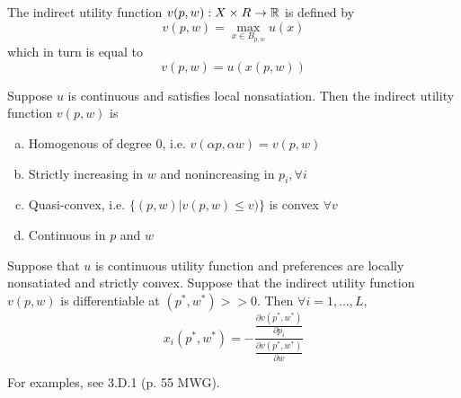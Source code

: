 \begin{definition}
  The indirect utility function $v(p,w): X \times R \to {\mathbb R}$ is defined by
  \[
  v(p,w) = \max_{x \in B_{p,w}} u(x)
  \]
  which in turn is equal to
  \[
  v(p,w) = u(x(p,w))
  \]
\end{definition}

\begin{prop}
  Suppose $u$ is continuous and satisfies local nonsatiation. Then the
  indirect utility function $v(p,w)$ is
  \begin{enumerate}[(a)]
  \item Homogenous of degree $0$, i.e. $v(\alpha p, \alpha w) = v(p,w)$
  \item Strictly increasing in $w$ and nonincreasing in $p_i, \forall i$
  \item Quasi-convex, i.e. $\{(p,w)|v(p,w) \leq v)\}$ is convex $\forall v$
  \item Continuous in $p$ and $w$
  \end{enumerate}
\end{prop}


\begin{prop}
  Suppose that $u$ is continuous utility function and preferences are
  locally nonsatiated and strictly convex. Suppose that the indirect
  utility function $v(p, w)$ is differentiable at $(p^*, w^*) >>
  0$. Then $\forall i = 1, \dots, L$,
  \[
  x_i(p^*, w^*)
  = - \frac{
    \frac{\partial v(p^*, w^*)}{\partial p_i}
  } {
    \frac{\partial v(p^*, w^*)}{\partial w}
  }
  \]
\end{prop}

For examples, see 3.D.1 (p. 55 MWG).